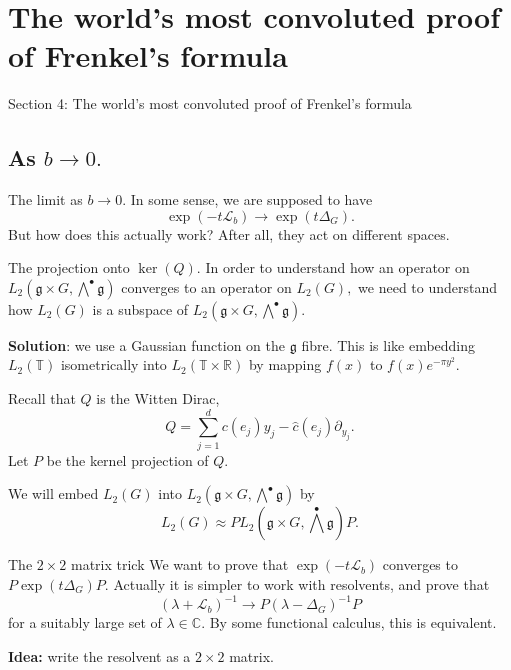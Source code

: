 \documentclass{beamer}
\numberwithin{equation}{section}
\theoremstyle{plain}
\theoremstyle{plain}
\theoremstyle{definition}
\theoremstyle{plain}
\theoremstyle{plain}
\theoremstyle{definition}
\newcommand{\Rl}{\mathbb{R}}
\newcommand{\Cplx}{\mathbb{C}}
\newcommand{\Circ}{\mathbb{T}}
\newcommand{\Lc}{\mathcal{L}}
\newcommand{\gf}{\mathfrak{g}}
\begin{document}
\section{The world's most convoluted proof of Frenkel's formula}

\begin{frame}
  \huge{Section 4: The world's most convoluted proof of Frenkel's formula}
\end{frame}

\subsection{As $b\to 0.$}

\begin{frame}{The limit as $b\to 0.$}
    In some sense, we are supposed to have
    \[
      \exp(-t\Lc_b)\rightarrow \exp(t\Delta_G).
    \]
    But how does this actually work? After all, they act on different spaces.
\end{frame}

\begin{frame}{The projection onto $\ker(Q).$}
  In order to understand how an operator on $L_2(\gf\times G,\bigwedge^{\bullet}\gf)$ converges to an operator on
  $L_2(G),$ we need to understand how $L_2(G)$ is a subspace of $L_2(\gf\times G,\bigwedge^{\bullet}\gf).$
  
  \textbf{Solution}: we use a Gaussian function on the $\gf$ fibre. 
  This is like embedding $L_2(\Circ)$ isometrically into $L_2(\Circ\times \Rl)$ by mapping $f(x)$ to $f(x)e^{-\pi y^2}.$
  
  \begin{definition}
    Recall that $Q$ is the Witten Dirac,
    \[
      Q = \sum_{j=1}^d c(e_j)y_j - \widehat{c}(e_j)\partial_{y_j}.
    \]
    Let $P$ be the kernel projection of $Q.$
  \end{definition}
  We will embed $L_2(G)$ into $L_2(\gf\times G,\bigwedge^{\bullet}\gf)$ by
  \[
    L_2(G)\approx  PL_2(\gf\times G,\bigwedge^{\bullet}\gf)P.
  \]
\end{frame}

\begin{frame}{The $2\times 2$ matrix trick}
  We want to prove that $\exp(-t\Lc_b)$ converges to $P\exp(t\Delta_G)P.$ Actually it is simpler to work with resolvents, and prove that
  \[
    (\lambda+\Lc_b)^{-1} \rightarrow P(\lambda-\Delta_G)^{-1}P
  \]
  for a suitably large set of $\lambda\in \Cplx.$ By some functional calculus, this is equivalent. 
  
  \textbf{Idea:} write the resolvent as a $2\times 2$ matrix.
\end{frame}
\end{document}
